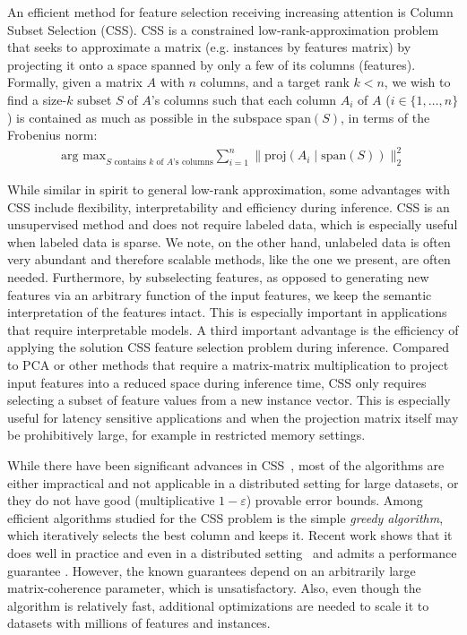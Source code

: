 \documentclass{article}
\newcommand{\argmax}{\text{arg max}}
\newcommand{\Proj}{\text{proj}}
\newcommand{\Span}{\text{span}}
\newcommand{\eps}{\varepsilon}
\begin{document}
An efficient method for feature selection receiving increasing attention is Column Subset Selection (CSS). CSS is a constrained low-rank-approximation problem that seeks to approximate a matrix (e.g. instances by features matrix) by projecting it onto a space spanned by only a few of its columns (features). Formally, given a matrix $A$ with $n$ columns, and a target rank $k < n$, we wish to find a size-$k$ subset $S$ of $A$'s columns such that each column $A_i$ of $A$ ($i \in \{1, \dots, n\}$) is contained as much as possible in the subspace $\Span(S)$, in terms of the Frobenius norm:
\begin{align*}
\argmax_{S \text{ contains $k$ of $A$'s columns}} \sum_{i=1}^n \|\Proj(A_i \; | \; \Span(S))\|_2^2
\end{align*}

While similar in spirit to general low-rank approximation, some advantages with CSS include flexibility,
interpretability and efficiency during inference. CSS is an
unsupervised method and does not require labeled data, which is
especially useful when labeled data is sparse.  We note, on the other
hand, unlabeled data is often very abundant and therefore scalable
methods, like the one we present, are often needed.  
Furthermore, by subselecting features, as opposed to generating new
features via an arbitrary function of the input features, we keep the
semantic interpretation of the features intact. This is especially
important in applications that require interpretable models.  A third
important advantage is the efficiency of applying the solution CSS
feature selection problem during inference. Compared to PCA or other
methods that require a matrix-matrix multiplication to project input
features into a reduced space during inference time, CSS only requires
selecting a subset of feature values from a new instance vector. This
is especially useful for latency sensitive applications and when the
projection matrix itself may be prohibitively large, for example in
restricted memory settings.

While there have been significant advances in CSS~\cite{Boutsidis1,Boutsidis2,Guruswami}, most of the algorithms are either impractical and not applicable in a distributed setting for large datasets, or they do not have good (multiplicative $1 - \eps$) provable error bounds. 
Among efficient algorithms  studied for the CSS problem is the simple {\em greedy algorithm}, which iteratively selects the best column and keeps it. Recent work shows that it does well in practice and even in a distributed setting~\cite{Farahat1, Farahat2} and admits a performance guarantee \cite{Civril1}. However, the known guarantees depend on an arbitrarily large matrix-coherence parameter, which is unsatisfactory. Also, even though the algorithm is relatively fast, additional optimizations are needed to scale it to datasets with millions of features and instances. 
\end{document}
